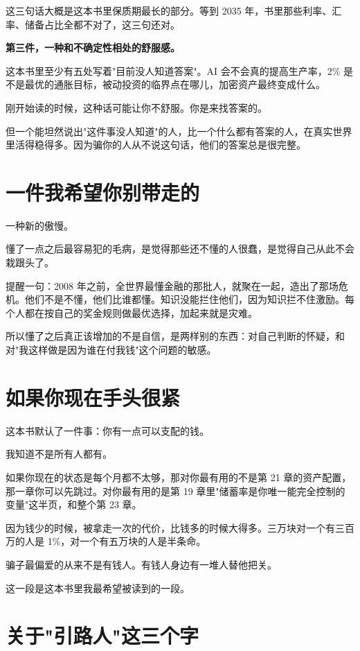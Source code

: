 这三句话大概是这本书里保质期最长的部分。等到 2035 年，书里那些利率、汇率、储备占比全都不对了，这三句还对。

\textbf{第三件，一种和不确定性相处的舒服感。}

这本书里至少有五处写着"目前没人知道答案"。AI 会不会真的提高生产率，2\% 是不是最优的通胀目标，被动投资的临界点在哪儿，加密资产最终变成什么。

刚开始读的时候，这种话可能让你不舒服。你是来找答案的。

但一个能坦然说出"这件事没人知道"的人，比一个什么都有答案的人，在真实世界里活得稳得多。因为骗你的人从不说这句话，他们的答案总是很完整。

\section{一件我希望你别带走的}

一种新的傲慢。

懂了一点之后最容易犯的毛病，是觉得那些还不懂的人很蠢，是觉得自己从此不会栽跟头了。

提醒一句：2008 年之前，全世界最懂金融的那批人，就聚在一起，造出了那场危机。他们不是不懂，他们比谁都懂。知识没能拦住他们，因为知识拦不住激励。每个人都在按自己的奖金规则做最优选择，加起来就是灾难。

所以懂了之后真正该增加的不是自信，是两样别的东西：对自己判断的怀疑，和对"我这样做是因为谁在付我钱"这个问题的敏感。

\section{如果你现在手头很紧}

这本书默认了一件事：你有一点可以支配的钱。

我知道不是所有人都有。

如果你现在的状态是每个月都不太够，那对你最有用的不是第 21 章的资产配置，那一章你可以先跳过。对你最有用的是第 19 章里"储蓄率是你唯一能完全控制的变量"这半页，和整个第 23 章。

因为钱少的时候，被拿走一次的代价，比钱多的时候大得多。三万块对一个有三百万的人是 1\%，对一个有五万块的人是半条命。

骗子最偏爱的从来不是有钱人。有钱人身边有一堆人替他把关。

这一段是这本书里我最希望被读到的一段。

\section{关于"引路人"这三个字}

